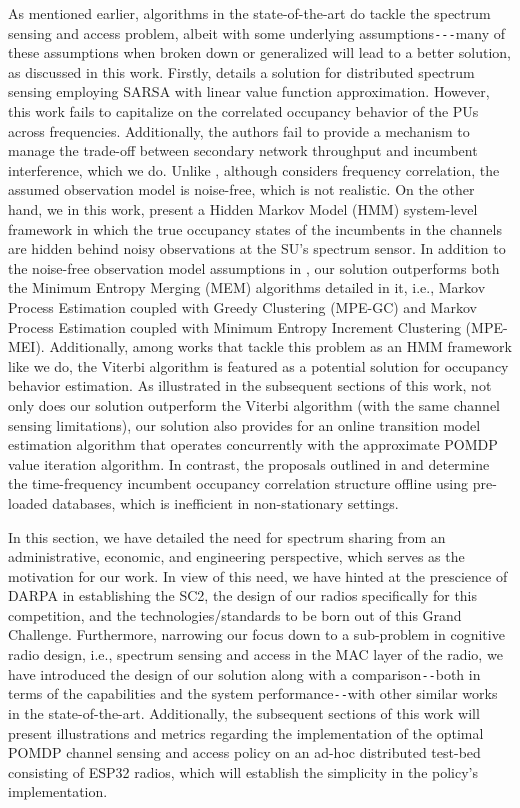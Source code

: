 \documentclass[12pt, draftcls, onecolumn]{IEEEtran}
\begin{document}
As mentioned earlier, algorithms in the state-of-the-art do tackle the spectrum sensing and access problem, albeit with some underlying assumptions\texttt{-{-}-}many of these assumptions when broken down or generalized will lead to a better solution, as discussed in this work. Firstly, \cite{WCL:5} details a solution for distributed spectrum sensing employing SARSA with linear value function approximation. However, this work fails to capitalize on the correlated occupancy behavior of the PUs across frequencies. Additionally, the authors fail to provide a mechanism to manage the trade-off between secondary network throughput and incumbent interference, which we do. Unlike \cite{WCL:5}, although \cite{WCL:7} considers frequency correlation, the assumed observation model is noise-free, which is not realistic. On the other hand, we in this work, present a Hidden Markov Model (HMM) system-level framework in which the true occupancy states of the incumbents in the channels are hidden behind noisy observations at the SU's spectrum sensor. In addition to the noise-free observation model assumptions in \cite{WCL:7}, our solution outperforms both the Minimum Entropy Merging (MEM) algorithms detailed in it, i.e., Markov Process Estimation coupled with Greedy Clustering (MPE-GC) and Markov Process Estimation coupled with Minimum Entropy Increment Clustering (MPE-MEI). Additionally, among works that tackle this problem as an HMM framework \cite{WCL:6} like we do, the Viterbi algorithm is featured as a potential solution for occupancy behavior estimation. As illustrated in the subsequent sections of this work, not only does our solution outperform the Viterbi algorithm (with the same channel sensing limitations), our solution also provides for an online transition model estimation algorithm that operates concurrently with the approximate POMDP value iteration algorithm. In contrast, the proposals outlined in \cite{WCL:6} and \cite{WCL:7} determine the time-frequency incumbent occupancy correlation structure offline using pre-loaded databases, which is inefficient in non-stationary settings.

In this section, we have detailed the need for spectrum sharing from an administrative, economic, and engineering perspective, which serves as the motivation for our work. In view of this need, we have hinted at the prescience of DARPA in establishing the SC2, the design of our radios specifically for this competition, and the technologies/standards to be born out of this Grand Challenge. Furthermore, narrowing our focus down to a sub-problem in cognitive radio design, i.e., spectrum sensing and access in the MAC layer of the radio, we have introduced the design of our solution along with a comparison\texttt{-{}-}both in terms of the capabilities and the system performance\texttt{-{}-}with other similar works in the state-of-the-art. Additionally, the subsequent sections of this work will present illustrations and metrics regarding the implementation of the optimal POMDP channel sensing and access policy on an ad-hoc distributed test-bed consisting of ESP32 radios, which will establish the simplicity in the policy's implementation.
\end{document}
